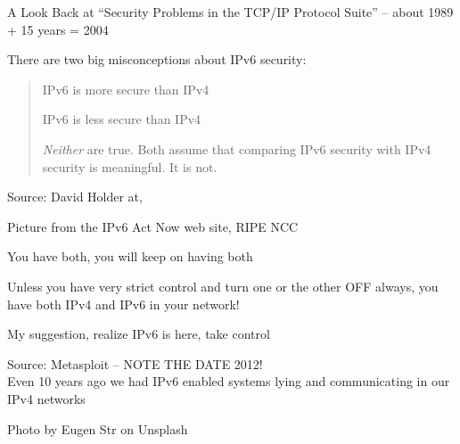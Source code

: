 \documentclass[Screen16to9,17pt]{foils}
\begin{document}
A Look Back at “Security Problems in the TCP/IP Protocol Suite” -- about 1989 + 15 years = 2004




There are two big misconceptions about IPv6 security:

\begin{quote}
\begin{list2}
\item IPv6 is more secure than IPv4
\item IPv6 is less secure than IPv4
\end{list2}

\emph{Neither} are true. Both assume that comparing IPv6 security with IPv4 security is meaningful. It is not.
\end{quote}
Source: David Holder at, 



Picture from the IPv6 Act Now web site, RIPE NCC

\begin{list2}
\item You have both, you will keep on having both
\item Unless you have very strict control and turn one or the other OFF always, you have both IPv4 and IPv6 in your network!
\item My suggestion, realize IPv6 is here, take control
\end{list2}


\slide{}

Source: Metasploit -- NOTE THE DATE 2012!\\
Even 10 years ago we had IPv6 enabled systems lying and communicating in our IPv4 networks








\hfill Photo by Eugen Str on Unsplash




\end{document}

